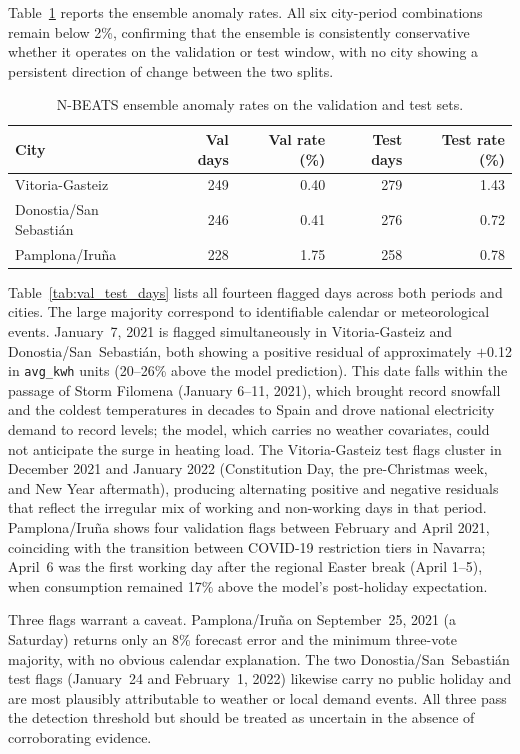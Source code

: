﻿\documentclass[12pt,reqno, twoside]{amsbook}
\numberwithin{figure}{chapter}
\numberwithin{table}{chapter}
\numberwithin{equation}{chapter}
\theoremstyle{plain}
\numberwithin{equation}{chapter}
\numberwithin{section}{chapter}
\begin{document}
Table~\ref{tab:val_test_rates} reports the ensemble anomaly rates. All six city-period combinations remain below 2\%, confirming that the ensemble is consistently conservative whether it operates on the validation or test window, with no city showing a persistent direction of change between the two splits.

\begin{table}[htbp]
\centering
\caption{N-BEATS ensemble anomaly rates on the validation and test sets.}
\label{tab:val_test_rates}
\begin{tabular}{lrrrr}
\toprule
\textbf{City} & \textbf{Val days} & \textbf{Val rate (\%)} & \textbf{Test days} & \textbf{Test rate (\%)} \\
\midrule
Vitoria-Gasteiz        & 249 & 0.40 & 279 & 1.43 \\
Donostia/San Sebasti\'{a}n & 246 & 0.41 & 276 & 0.72 \\
Pamplona/Iru\~{n}a      & 228 & 1.75 & 258 & 0.78 \\
\bottomrule
\end{tabular}
\end{table}

Table~\ref{tab:val_test_days} lists all fourteen flagged days across both periods and cities. The large majority correspond to identifiable calendar or meteorological events. January~7, 2021 is flagged simultaneously in Vitoria-Gasteiz and Donostia/San~Sebasti\'{a}n, both showing a positive residual of approximately $+$0.12 in \texttt{avg\_kwh} units (20--26\% above the model prediction). This date falls within the passage of Storm Filomena (January 6--11, 2021), which brought record snowfall and the coldest temperatures in decades to Spain and drove national electricity demand to record levels; the model, which carries no weather covariates, could not anticipate the surge in heating load. The Vitoria-Gasteiz test flags cluster in December 2021 and January 2022 (Constitution Day, the pre-Christmas week, and New Year aftermath), producing alternating positive and negative residuals that reflect the irregular mix of working and non-working days in that period. Pamplona/Iru\~{n}a shows four validation flags between February and April 2021, coinciding with the transition between COVID-19 restriction tiers in Navarra; April~6 was the first working day after the regional Easter break (April 1--5), when consumption remained 17\% above the model's post-holiday expectation.

Three flags warrant a caveat. Pamplona/Iru\~{n}a on September~25, 2021 (a Saturday) returns only an 8\% forecast error and the minimum three-vote majority, with no obvious calendar explanation. The two Donostia/San~Sebasti\'{a}n test flags (January~24 and February~1, 2022) likewise carry no public holiday and are most plausibly attributable to weather or local demand events. All three pass the detection threshold but should be treated as uncertain in the absence of corroborating evidence.
\end{document}
